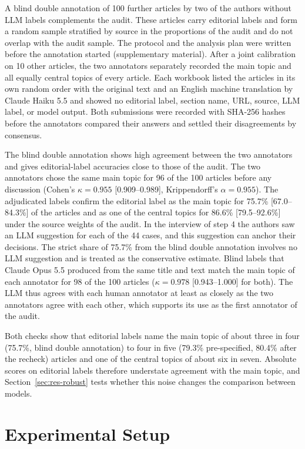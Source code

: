 \documentclass{ieeeaccess}
\begin{document}
A blind double annotation of 100 further articles by two of the authors without LLM labels complements the audit. These articles carry editorial labels and form a random sample stratified by source in the proportions of the audit and do not overlap with the audit sample. The protocol and the analysis plan were written before the annotation started (supplementary material). After a joint calibration on 10 other articles, the two annotators separately recorded the main topic and all equally central topics of every article. Each workbook listed the articles in its own random order with the original text and an English machine translation by Claude Haiku 5.5 and showed no editorial label, section name, URL, source, LLM label, or model output. Both submissions were recorded with SHA-256 hashes before the annotators compared their answers and settled their disagreements by consensus.

The blind double annotation shows high agreement between the two annotators and gives editorial-label accuracies close to those of the audit. The two annotators chose the same main topic for 96 of the 100 articles before any discussion (Cohen's $\kappa=0.955$ [0.909--0.989], Krippendorff's $\alpha=0.955$). The adjudicated labels confirm the editorial label as the main topic for 75.7\% [67.0--84.3\%] of the articles and as one of the central topics for 86.6\% [79.5--92.6\%] under the source weights of the audit. In the interview of step 4 the authors saw an LLM suggestion for each of the 44 cases, and this suggestion can anchor their decisions. The strict share of 75.7\% from the blind double annotation involves no LLM suggestion and is treated as the conservative estimate. Blind labels that Claude Opus 5.5 produced from the same title and text match the main topic of each annotator for 98 of the 100 articles ($\kappa=0.978$ [0.943--1.000] for both). The LLM thus agrees with each human annotator at least as closely as the two annotators agree with each other, which supports its use as the first annotator of the audit.

Both checks show that editorial labels name the main topic of about three in four (75.7\%, blind double annotation) to four in five (79.3\% pre-specified, 80.4\% after the recheck) articles and one of the central topics of about six in seven. Absolute scores on editorial labels therefore understate agreement with the main topic, and Section~\ref{sec:res-robust} tests whether this noise changes the comparison between models.

\section{Experimental Setup}
\label{sec:setup}
\end{document}
